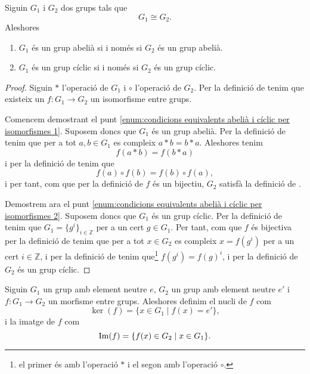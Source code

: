 \documentclass[../Apunts.tex]{subfiles}
\begin{document}
	\begin{proposition}
		\label{prop:condicions equivalents abelià i cíclic per isomorfismes}
		Siguin \(G_{1}\) i \(G_{2}\) dos grups tals que
		\[G_{1}\cong G_{2}.\]
		Aleshores
		\begin{enumerate}
			\item\label{enum:condicions equivalents abelià i cíclic per isomorfismes 1} \(G_{1}\) és un grup abelià si i només si \(G_{2}\) és un grup abelià.
			\item\label{enum:condicions equivalents abelià i cíclic per isomorfismes 2} \(G_{1}\) és un grup cíclic si i només si \(G_{2}\) és un grup cíclic.
		\end{enumerate}
		\begin{proof}
			Siguin \(\ast\) l'operació de \(G_{1}\) i \(\circ\) l'operació de \(G_{2}\). Per la definició de  tenim que existeix un \(f\colon G_{1}\to G_{2}\) un isomorfisme entre grups.
			
			Comencem demostrant el punt \eqref{enum:condicions equivalents abelià i cíclic per isomorfismes 1}. Suposem doncs que \(G_{1}\) és un grup abelià. Per la definició de  tenim que per a tot \(a,b\in G_{1}\) es compleix \(a\ast b=b\ast a\). Aleshores tenim
			\[f(a\ast b)=f(b\ast a)\]
			i per la definició de  tenim que
			\[f(a)\circ f(b)=f(b)\circ f(a),\]
			i per tant, com que per la definició de  \(f\) és un bijectiu, \(G_{2}\) satisfà la definició de .
			
			Demostrem ara el punt \eqref{enum:condicions equivalents abelià i cíclic per isomorfismes 2}. Suposem doncs que \(G_{1}\) és un grup cíclic. Per la definició de  tenim que \(G_{1}=\{g^{i}\}_{i\in\mathbb{Z}}\) per a un cert \(g\in G_{1}\). Per tant, com que \(f\) és bijectiva per la definició de  tenim que per a tot \(x\in G_{2}\) es compleix \(x=f(g^{i})\) per a un cert \(i\in\mathbb{Z}\), i per la definició de  tenim que\footnote{el primer és amb l'operació \(\ast\) i el segon amb l'operació \(\circ\).} \(f(g^{i})=f(g)^{i}\), i per la definició de  \(G_{2}\) és un grup cíclic.
		\end{proof}
	\end{proposition}
	\begin{definition}
		\label{def:nucli d'un morfisme entre grups}
		\label{def:imatge d'un morfisme entre grups}
		Siguin \(G_{1}\) un grup amb element neutre \(e\), \(G_{2}\) un grup amb  element neutre \(e'\) i \(f\colon G_{1}\to G_{2}\) un morfisme entre grups. Aleshores definim el nucli de \(f\) com
		\[\ker(f)=\{x\in G_{1}\mid f(x)=e'\},\]
		i la imatge de \(f\) com
		\[\operatorname{Im}(f)=\{f(x)\in G_{2}\mid x\in G_{1}\}.\]
	\end{definition}
\end{document}
